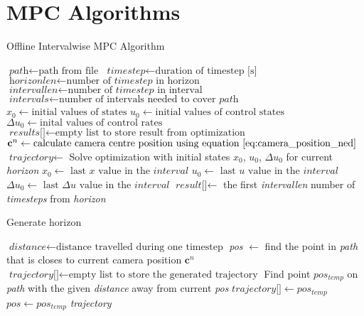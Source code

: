 \chapter{MPC Algorithms}
\label{sec:appendix_algorithms}

\begin{algorithm}
\caption{Offline Intervalwise MPC Algorithm}
\label{alg:mpc}
\begin{algorithmic}
	\State $\textit{path} \gets \text{path from file}$
	\State $\textit{timestep} \gets \text{duration of timestep [s]}$
	\State $\textit{horizonlen} \gets \text{number of } \textit{timestep} \text{ in horizon}$
	\State $\textit{intervallen} \gets \text{number of } \textit{timestep} \text{ in interval}$
	\State $\textit{intervals} \gets \text{number of intervals needed to cover } \textit{path}$
	\State $\textit{x}_0 \gets \text{initial values of states}$
	\State $\textit{u}_0 \gets \text{initial values of control states}$
	\State $\Delta\textit{u}_0 \gets \text{inital values of control rates}$
	\State $\textit{results[]} \gets \text{empty list to store result from optimization}$
		\State $\mathbf{c}^n \gets \text{calculate camera centre position using equation } \ref{eq:camera_position_ned}$
		\State $\textit{trajectory} \gets$ 
		\State Solve optimization with initial states $x_0$, $u_0$, $\Delta u_0$ for current \textit{horizon}
		\State $\textit{x}_0 \gets \text{ last } \textit{x} \text{ value in the } \textit{interval}$
		\State $\textit{u}_0 \gets \text{ last } \textit{u} \text{ value in the } \textit{interval}$
		\State $\Delta\textit{u}_0 \gets \text{ last } \Delta\textit{u} \text{ value in the } \textit{interval}$
		\State $\textit{result[]} \gets$ the first \textit{intervallen} number of \textit{timesteps} from \textit{horizon}
	\EndFor
\EndProcedure
\end{algorithmic}
\end{algorithm}

\begin{algorithm}
\caption{Generate horizon}
\label{alg:genHor}
\begin{algorithmic}
	\State $\textit{distance} \gets \text{distance travelled during one timestep}$
	\State \textit{pos} $\gets$ find the point in \textit{path} that is closes to current camera position $\mathbf{c}^n$
	\State $\textit{trajectory[]} \gets \text{empty list to store the generated trajectory}$
		\State Find point \textit{$pos_{temp}$} on \textit{path} with the given \textit{distance} away from current \textit{pos}
		\State $\textit{trajectory[]} \gets pos_{temp}$
		\State $pos \gets pos_{temp}$
	\EndFor
	\Return \textit{trajectory}
\EndProcedure
\end{algorithmic}
\end{algorithm}